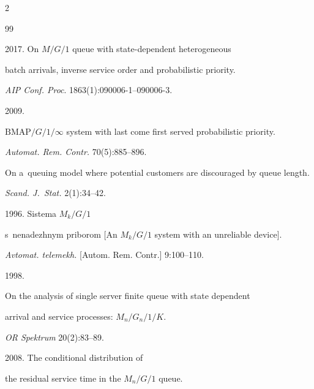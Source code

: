 \begin{multicols}{2}
{{\begin{thebibliography}{99}


 2017. On ${M/G/1}$ queue with state-dependent heterogeneous


 batch arrivals, inverse service order and probabilistic priority. 


 \textit{AIP Conf. Proc}. 1863(1):090006-1--090006-3.


 




 2009. 


${\mathrm{BMAP}/G/1/\infty}$ system with last come first served probabilistic priority.


\textit{Automat. Rem. \mbox{Contr.}} 70(5):885--896.







 On a~queuing model where potential customers are discouraged by queue length.


\textit{Scand. J.~Stat.} 2(1):34--42.







 1996. Sistema ${M_k/G/1}$ 


s~nenadezhnym priborom [An ${M_k/G/1}$  system with an unreliable device].


\textit{Avtomat. telemekh.} [Autom. Rem. Contr.] 9:100--110.













 1998.


On the analysis of single server finite queue with state dependent


arrival and service processes: ${M_n/G_n/1/K}$.


\textit{OR Spektrum} 20(2):83--89.







 2008. The conditional distribution of 


the residual service time in the ${M_n/G/1}$ queue.



\end{thebibliography}}}
\end{multicols}
